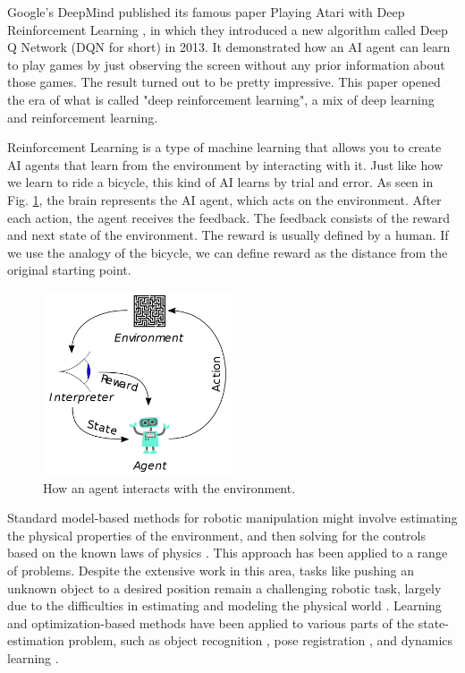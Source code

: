 
Google's DeepMind published its famous paper Playing Atari with Deep Reinforcement Learning \cite {Mnih2015AtariNature}, in which they introduced a new algorithm called Deep Q Network (DQN for short) in 2013. It demonstrated how an AI agent can learn to play games by just observing the screen without any prior information about those games. The result turned out to be pretty impressive. This paper opened the era of what is called "deep reinforcement learning", a mix of deep learning and reinforcement learning.

Reinforcement Learning is a type of machine learning that allows you to create AI agents that learn from the environment by interacting with it. Just like how we learn to ride a bicycle, this kind of AI learns by trial and error. As seen in Fig. \ref {fig:deepmind}, the brain represents the AI agent, which acts on the environment. After each action, the agent receives the feedback. The feedback consists of the reward and next state of the environment. The reward is usually defined by a human. If we use the analogy of the bicycle, we can define reward as the distance from the original starting point.

\begin{figure}[h] 
\centering
\includegraphics[width=0.5\textwidth]{figs/ch1/Reinforcement_learning_diagram}
\caption{How an agent interacts with the environment.}
\label{fig:deepmind}
\end{figure}

Standard model-based methods for robotic manipulation might involve estimating the physical properties of the environment, and then solving for the controls based on the known laws of physics \cite{OK-Robot-1987} \cite{Predictive2014} \cite{PlanningFramework2012}. This approach has been applied to a range of problems. Despite the extensive work in this area, tasks like pushing an unknown object to a desired position remain a challenging robotic task, largely due to the difficulties in estimating and modeling the physical world \cite{IROS2016}. Learning and optimization-based methods have been applied to various parts of the state-estimation problem, such as object recognition \cite{Visual1995}, pose registration \cite{ObjectRecognition2009}, and dynamics learning \cite{DynamicsDoor2013}.

